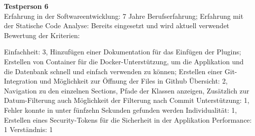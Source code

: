 \textbf{Testperson 6} \\
Erfahrung in der Softwareentwicklung: 7 Jahre Berufserfahrung; Erfahrung mit der Statische Code Analyse: Bereits eingesetzt und wird aktuell verwendet\\
Bewertung der Kriterien:

Einfachheit: 3, Hinzufügen einer Dokumentation für das Einfügen der Plugins; Erstellen von Container für die Docker-Unterstützung, um die Applikation und die Datenbank schnell und einfach verwenden zu können; Erstellen einer Git-Integration und Möglichkeit zur Öffnung der Files in Github  \newline Übersicht: 2, Navigation zu den einzelnen Sections, Pfade der Klassen anzeigen, Zusätzlich zur Datum-Filterung auch Möglichkeit der Filterung nach Commit \newline  Unterstützung: 1, Fehler konnte in unter fünfzehn Sekunden gefunden werden \newline Individualität: 1, Erstellen eines Security-Tokens für die Sicherheit in der Applikation \newline Performance: 1 \newline  Verständnis: 1\newline 

